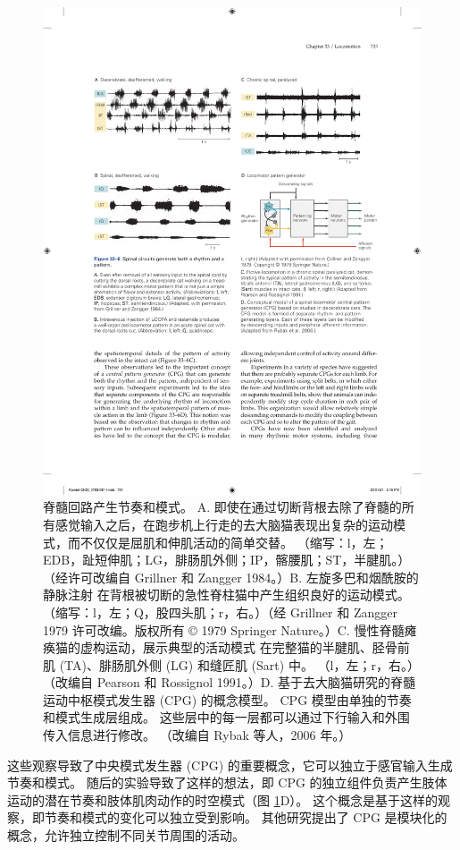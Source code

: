 \begin{figure}[htbp]
	\centering
	\includegraphics[width=0.95\linewidth]{chap33/fig_33_6}
	\caption{脊髓回路产生节奏和模式。 A. 即使在通过切断背根去除了脊髓的所有感觉输入之后，在跑步机上行走的去大脑猫表现出复杂的运动模式，而不仅仅是屈肌和伸肌活动的简单交替。 （缩写：l，左；EDB，趾短伸肌；LG，腓肠肌外侧；IP，髂腰肌；ST，半腱肌。）（经许可改编自 Grillner 和 Zangger 1984。）B. 左旋多巴和烟酰胺的静脉注射 在背根被切断的急性脊柱猫中产生组织良好的运动模式。 （缩写：l，左；Q，股四头肌；r，右。）（经 Grillner 和 Zangger 1979 许可改编。版权所有 © 1979 Springer Nature。）C. 慢性脊髓瘫痪猫的虚构运动，展示典型的活动模式 在完整猫的半腱肌、胫骨前肌 (TA)、腓肠肌外侧 (LG) 和缝匠肌 (Sart) 中。 （l，左；r，右。）（改编自 Pearson 和 Rossignol 1991。）D. 基于去大脑猫研究的脊髓运动中枢模式发生器 (CPG) 的概念模型。 CPG 模型由单独的节奏和模式生成层组成。 这些层中的每一层都可以通过下行输入和外围传入信息进行修改。 （改编自 Rybak 等人，2006 年。）}
	\label{fig:33_6}
\end{figure}

这些观察导致了中央模式发生器 (CPG) 的重要概念，它可以独立于感官输入生成节奏和模式。 随后的实验导致了这样的想法，即 CPG 的独立组件负责产生肢体运动的潜在节奏和肢体肌肉动作的时空模式（图 \ref{fig:33_6}D）。
这个概念是基于这样的观察，即节奏和模式的变化可以独立受到影响。
其他研究提出了 CPG 是模块化的概念，允许独立控制不同关节周围的活动。


